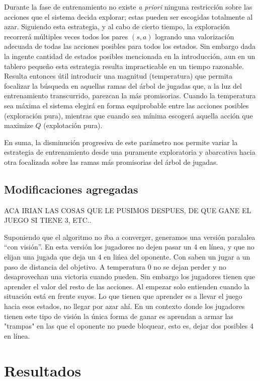 \documentclass[11pt, spanish]{article}
\begin{document}
\par Durante la fase de entrenamiento no existe \emph{a priori} ninguna 
restricción sobre las acciones que el sistema decida explorar; estas pueden ser 
escogidas totalmente al azar. Siguiendo esta estrategia, y al cabo de 
cierto tiempo, la exploración recorrerá múltiples veces todos los pares 
$(s,a)$ logrando una valorización adecuada de todas las acciones posibles para 
todos los estados. Sin embargo dada la ingente cantidad de estados posibles 
mencionada en la introducción, aun en un tablero pequeño esta estrategia 
resulta impracticable en un tiempo razonable. Resulta entonces útil introducir 
una magnitud (temperatura) que permita focalizar la búsqueda en aquellas ramas 
del árbol de jugadas que, a la luz del entrenamiento transcurrido, parezcan la 
más promisorias. Cuando la temperatura sea máxima el sistema elegirá en forma 
equiprobable entre las acciones posibles (exploración pura), mientras que 
cuando sea mínima escogerá aquella acción que maximize $Q$ (explotación pura).
\par En suma, la disminución progresiva de este parámetro nos permite variar la 
estrategia de entrenamiento desde una puramente exploratoria y abarcativa hacia 
otra focalizada sobre las ramas más promisorias del árbol de jugadas.

\subsection{Modificaciones agregadas}
ACA IRIAN LAS COSAS QUE LE PUSIMOS DESPUES, DE QUE GANE EL JUEGO SI TIENE 3, 
ETC..

Suponiendo que el algoritmo no iba a converger, generamos una versi\'on paralalea ``con visi\'on''. En esta versi\'on los jugadores no dejen pasar un 4 en l\'inea, y que no elijan una jugada que deja un 4 en li\'nea del oponente. Con saben un jugar a un paso de distancia del objetivo. A temperatura 0 no se dejan perder y no desaprovechan una victoria cuando pueden. Sin embargo los jugadores tienen que aprender el valor del resto de las acciones. Al empezar solo entienden cuando la situación está en frente suyos. Lo que tienen que aprender es a llevar el juego hacia esos estados, no llegar por azar ahí. En un contexto donde los jugadores tienen este tipo de visi\'on la \'unica forma de ganar es aprendan a armar las "trampas" en las que el oponente no puede bloquear, esto es, dejar dos posibles 4 en línea.


\section{Resultados}
\end{document}
